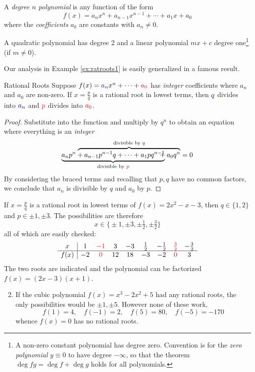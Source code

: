 \goodbreak

\begin{defn}{}{}
A \emph{degree $n$ polynomial} is any function of the form
\[f(x)=a_nx^n+a_{n-1}x^{n-1}+\cdots+a_1x+a_0\]
where the \emph{coefficients} $a_k$ are constants with $a_n\neq 0$.
\end{defn}

A quadratic polynomial has degree 2 and a linear polynomial $mx+c$ degree one\footnote{A non-zero constant polynomial has degree zero. Convention is for the \emph{zero polynomial} $y\equiv 0$ to have degree $-\infty$, so that the theorem $\operatorname{deg} fg=\operatorname{deg} f+\operatorname{deg} g$ holds for all polynomials.} (if $m\neq 0$).\smallbreak

Our analysis in Example \ref{ex:ratroots1} is easily generalized in a famous result.

\begin{thm}{Rational Roots}{}
Suppose $f(x)=\textcolor{blue}{a_n}x^n+\cdots+\textcolor{red}{a_0}$ has \emph{integer} coefficients where $a_n$ and $a_0$ are non-zero. If $x=\frac pq$ is a rational root in lowest terms, then $\textcolor{blue}{q}$ divides into $\textcolor{blue}{a_n}$ and $\textcolor{red}{p}$ divides into $\textcolor{red}{a_0}$.
\end{thm}

\begin{proof}
Substitute into the function and multiply by $q^n$ to obtain an equation where everything is an \emph{integer}\vspace{-10pt}
\[\underbrace{a_np^n+a_{n-1}p^{n-1}q+\cdots+a_1pq^{n-1}}_{\text{divisible by $\textcolor{red}{p}$}} \hspace{-129pt} \overbrace{\phantom{a_{n-1}p^{n-1}q+\cdots+a_1pq^{n-1}}+a_0q^n}^{\text{divisible by $\textcolor{blue}{q}$}}=0\]
By considering the braced terms and recalling that $p,q$ have no common factors, we conclude that $a_n$ is divisible by $q$ and $a_0$ by $p$.
\end{proof}


\begin{examples}{}{}
\exstart If $x=\frac pq$ is a rational root in lowest terms of $f(x)=2x^2-x-3$, then $q\in\{1,2\}$ and $p\in{\pm 1,\pm 3}$. The possibilities are therefore
\[x\in\bigl\{\pm 1,\pm 3,\pm\tfrac 12,\pm\tfrac 32\bigr\}\]
all of which are easily checked:
\[
\begin{array}{c|cccccccc}
x&1&\textcolor{red}{-1}&3&-3&\frac 12&-\frac 12&\textcolor{red}{\frac 32}&-\frac 32\\\hline
f(x)&-2&\textcolor{red}{0}&12&18&-3&-2&\textcolor{red}{0}&3
\end{array}
\]
The two roots are indicated and the polynomial can be factorized $f(x)=(2x-3)(x+1)$.
\begin{enumerate}\setcounter{enumi}{1}
  \item If the cubic polynomial $f(x)=x^3-2x^2+5$ had any rational roots, the only  possibilities would be $\pm 1, \pm 5$. However none of these work,
  \[f(1)=4,\quad f(-1)=2,\quad f(5)=80,\quad f(-5)=-170\]
  whence $f(x)=0$ has no rational roots.
\end{enumerate}
\end{examples}

